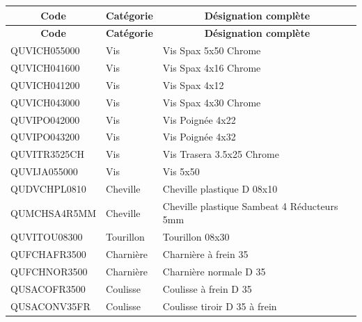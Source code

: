 \documentclass[12pt,a4paper]{article}
\begin{document}
\begin{longtable}{|p{3cm}|p{3cm}|p{8cm}|}
\hline
\multicolumn{1}{|c|}{\textbf{Code}} & \multicolumn{1}{c|}{\textbf{Catégorie}} & \multicolumn{1}{c|}{\textbf{Désignation complète}} \\
\hline
\endfirsthead
\hline
\multicolumn{1}{|c|}{\textbf{Code}} & \multicolumn{1}{c|}{\textbf{Catégorie}} & \multicolumn{1}{c|}{\textbf{Désignation complète}} \\
\hline
\endhead
\hline
\endfoot
QUVICH055000 & Vis & Vis Spax 5x50 Chrome \\
QUVICH041600 & Vis & Vis Spax 4x16 Chrome \\
QUVICH041200 & Vis & Vis Spax 4x12 \\
QUVICH043000 & Vis & Vis Spax 4x30 Chrome \\
QUVIPO042000 & Vis & Vis Poignée 4x22 \\
QUVIPO043200 & Vis & Vis Poignée 4x32 \\
QUVITR3525CH & Vis & Vis Trasera 3.5x25 Chrome \\
QUVIJA055000 & Vis & Vis 5x50 \\
QUDVCHPL0810 & Cheville & Cheville plastique D 08x10 \\
QUMCHSA4R5MM & Cheville & Cheville plastique Sambeat 4 Réducteurs 5mm \\
QUVITOU08300 & Tourillon & Tourillon 08x30 \\
QUFCHAFR3500 & Charnière & Charnière à frein 35 \\
QUFCHNOR3500 & Charnière & Charnière normale D 35 \\
QUSACOFR3500 & Coulisse & Coulisse à frein D 35 \\
QUSACONV35FR & Coulisse & Coulisse tiroir D 35 à frein \\
\hline
\end{longtable}
\end{document}
